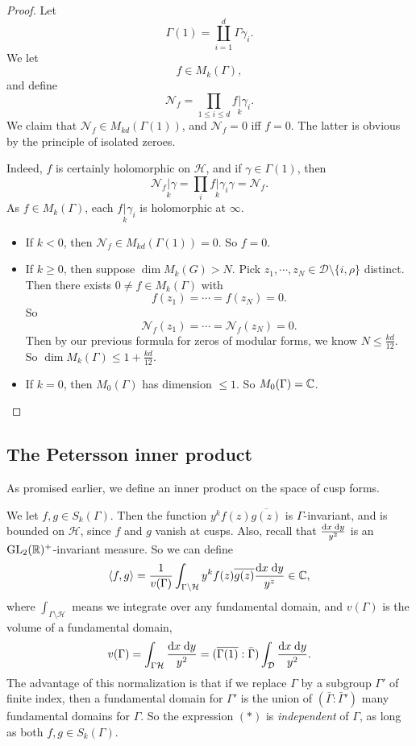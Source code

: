 \documentclass[a4paper]{article}
\renewcommand{\H}{\mathcal{H}}
\begin{document}
\begin{proof}
  Let
  \[
    \Gamma(1) = \coprod_{i = 1}^d \Gamma \gamma_i.
  \]
  We let
  \[
    f \in M_k(\Gamma),
  \]
  and define
  \[
    \mathcal{N}_f = \prod_{1 \leq i \leq d} f\underset{k}{|} \gamma_i.
  \]
  We claim that $\mathcal{N}_f \in M_{kd} (\Gamma(1))$, and $\mathcal{N}_f = 0$ iff $f = 0$. The latter is obvious by the principle of isolated zeroes.

  Indeed, $f$ is certainly holomorphic on $\H$, and if $\gamma \in \Gamma(1)$, then
  \[
    \mathcal{N}_f\underset{k}{|} \gamma = \prod_i f\underset{k}{|} \gamma_i \gamma = \mathcal{N}_f.
  \]
  As $f \in M_k(\Gamma)$, each $f\underset{k}{|} \gamma_i$ is holomorphic at $\infty$.
  \begin{itemize}
    \item If $k < 0$, then $\mathcal{N}_f \in M_{kd} (\Gamma(1)) = 0$. So $f = 0$.
    \item If $k \geq 0$, then suppose $\dim M_k(G) > N$. Pick $z_1, \cdots, z_N \in \mathcal{D} \setminus \{i, \rho\}$ distinct. Then there exists $0 \not= f \in M_k(\Gamma)$ with
      \[
        f(z_1) = \cdots = f(z_N) = 0.
      \]
      So
      \[
        \mathcal{N}_f(z_1) = \cdots = \mathcal{N}_f (z_N) = 0.
      \]
      Then by our previous formula for zeros of modular forms, we know $N \leq \frac{kd}{12}$. So $\dim M_k(\Gamma) \leq1 + \frac{kd}{12}$.
    \item If $k = 0$, then $M_0(\Gamma)$ has dimension $\leq 1$. So $M_0(\Gamma) = \mathbb{C}$.\qedhere
  \end{itemize}
\end{proof}

\subsection{The Petersson inner product}
As promised earlier, we define an inner product on the space of cusp forms.

We let $f, g \in S_k(\Gamma)$. Then the function $y^k f(z) \overline{g(z)}$ is $\Gamma$-invariant, and is bounded on $\H$, since $f$ and $g$ vanish at cusps. Also, recall that $\frac{\mathrm{d} x\; \mathrm{d} y}{y^2}$ is an $\mathrm{GL}_2(\mathbb{R})^+$-invariant measure. So we can define
\[
  \bra f, g\ket = \frac{1}{v(\Gamma)} \int_{\Gamma \setminus \H} y^k f(z) \overline{g(z)} \frac{\d x\; \d y}{y^z} \in \C,
\]
where $\int_{\Gamma \setminus \H}$ means we integrate over any fundamental domain, and $v(\Gamma)$ is the volume of a fundamental domain,
\[
  v(\Gamma) = \int_{\Gamma \H} \frac{\d x\; \d y}{y^2} = (\overline{\Gamma(1)}:\bar{\Gamma}) \int_\mathcal{D} \frac{\d x\;\d y}{y^2}.
\]
The advantage of this normalization is that if we replace $\Gamma$ by a subgroup $\Gamma'$ of finite index, then a fundamental domain for $\Gamma'$ is the union of $(\bar{\Gamma}: \bar{\Gamma}')$ many fundamental domains for $\Gamma$. So the expression $(*)$ is \emph{independent} of $\Gamma$, as long as both $f, g \in S_k(\Gamma)$.
\end{document}
